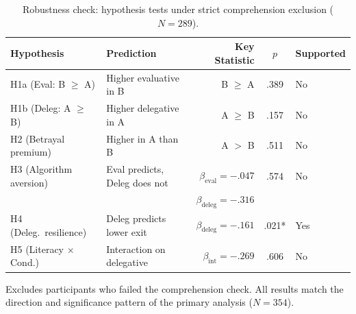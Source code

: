 \begin{table}[H]
\centering
\begin{threeparttable}
\caption{Robustness check: hypothesis tests under strict comprehension exclusion ($N = 289$).}
\label{tab:supp_robust_comp}
\begin{small}
\begin{tabular}{llrcl}
\toprule
Hypothesis & Prediction & Key Statistic & $p$ & Supported \\
\midrule
H1a (Eval: B $\geq$ A) & Higher evaluative in B & B $\geq$ A & .389 & No \\
H1b (Deleg: A $\geq$ B) & Higher delegative in A & A $\geq$ B & .157 & No \\
H2 (Betrayal premium) & Higher in A than B & A $>$ B & .511 & No \\
H3 (Algorithm aversion) & Eval predicts, Deleg does not & $\beta_\text{eval} = -.047$ & .574 & No \\
                         &                               & $\beta_\text{deleg} = -.316$ & & \\
H4 (Deleg.\ resilience) & Deleg predicts lower exit & $\beta_\text{deleg} = -.161$ & .021* & Yes \\
H5 (Literacy $\times$ Cond.) & Interaction on delegative & $\beta_\text{int} = -.269$ & .606 & No \\
\bottomrule
\end{tabular}
\end{small}
\begin{tablenotes}
\small
\item Excludes participants who failed the comprehension check. All results match the direction and significance pattern of the primary analysis ($N = 354$).
\end{tablenotes}
\end{threeparttable}
\end{table}


